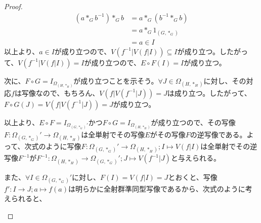 \documentclass[dvipdfmx]{jsarticle}
\begin{document}
\begin{proof}
\begin{align*}
\left( a*_{G}b^{- 1} \right)*_{G}b &= a*_{G}\left( b^{- 1}*_{G}b \right)\\
&= a*_{G}1_{\left( G,*_{G} \right)}\\
&= a \in I
\end{align*}
以上より、$a \in I$が成り立つので、$V\left( f^{- 1}|V\left( f|I \right) \right) \subseteq I$が成り立つ。したがって、$V\left( f^{- 1}|V\left( f|I \right) \right) = I$が成り立つので、$E \circ F(I) = I$が成り立つ。\par
次に、$F \circ G = I_{\varOmega_{\left( H,*_{H} \right)}}$が成り立つことを示そう。$\forall J \in \varOmega_{\left( H,*_{H} \right)}$に対し、その対応$f$は写像なので、もちろん、$V\left( f|V\left( f^{- 1}|J \right) \right) = J$は成り立つ。したがって、$F \circ G(J) = V\left( f|V\left( f^{- 1}|J \right) \right) = J$が成り立つ。\par
以上より、$E \circ F = I_{\varOmega_{\left( G,*_{G} \right)}'}$かつ$F \circ G = I_{\varOmega_{\left( H,*_{H} \right)}}$が成り立つので、その写像$F:\varOmega_{\left( G,*_{G} \right)}' \rightarrow \varOmega_{\left( H,*_{H} \right)}$は全単射でその写像$E$がその写像$F$の逆写像である。よって、次式のように写像$F:\varOmega_{\left( G,*_{G} \right)}' \rightarrow \varOmega_{\left( H,*_{H} \right)};I \mapsto V\left( f|I \right)$は全単射でその逆写像$F^{- 1}$が$F^{- 1}:\varOmega_{\left( H,*_{H} \right)} \rightarrow \varOmega_{\left( G,*_{G} \right)}';J \mapsto V\left( f^{- 1}|J \right)$と与えられる。\par
また、$\forall I \in \varOmega_{\left( G,*_{G} \right)}'$に対し、$F(I) = V\left( f|I \right) = J$とおくと、写像$f':I \rightarrow J;a \mapsto f(a)$は明らかに全射群準同型写像であるから、次式のように考えられると、
\begin{center}

\end{center}
\end{proof}
\end{document}
